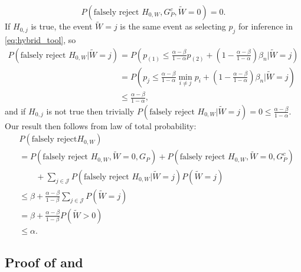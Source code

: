 \documentclass{article}
\begin{document}
\begin{appendix}
\begin{equation*}
    P(\text{falsely reject } H_{0, W}, G^c_P, \widetilde{W} = 0) = 0. 
\end{equation*}
If $H_{0, j}$ is true, the event $\widetilde{W} = j$ is the same event as selecting $p_j$ for inference in \eqref{eq:hybrid_tool}, so 
\begin{align*}
    P(\text{falsely reject } H_{0, W} | \widetilde{W} = j) &= P\left(p_{(1)} \leq \frac{\alpha-\beta}{1-\alpha} p_{(2)} + \left(1 - \frac{\alpha-\beta}{1-\alpha} \right) \beta_n | \widetilde{W} = j\right)\\
    &=  P\left(p_j \leq \frac{\alpha-\beta}{1-\alpha} \min_{i \neq j}p_i + \left(1 - \frac{\alpha-\beta}{1-\alpha} \right) \beta_n | \widetilde{W} = j\right)\\
    &\leq \frac{\alpha - \beta}{1-\alpha},
\end{align*}
and if $H_{0, j}$ is not true then trivially $P(\text{falsely reject } H_{0, W} | \widetilde{W} = j) = 0 \leq \frac{\alpha - \beta}{1-\alpha}$. Our result then follows from law of total probability:
\begin{align*}
    &P(\text{falsely reject} H_{0, W} )\\
    &= P(\text{falsely reject } H_{0, W}, \widetilde{W} = 0, G_P) + P(\text{falsely reject } H_{0, W}, \widetilde{W} = 0, G_P^c) \\
    &\qquad + \sum_{j \in \mathcal{J}}P(\text{falsely reject } H_{0, W} | \widetilde{W} = j ) P(\widetilde{W} = j)\\
    &\leq \beta + \frac{\alpha - \beta}{1-\beta} \sum_{j \in \mathcal{J}} P(\widetilde{W} = j)\\
    &= \beta + \frac{\alpha - \beta}{1-\beta} P(\widetilde{W} > 0)\\
    &\leq \alpha. 
\end{align*}

\subsection{Proof of  and  }


\end{appendix}
\end{document}
